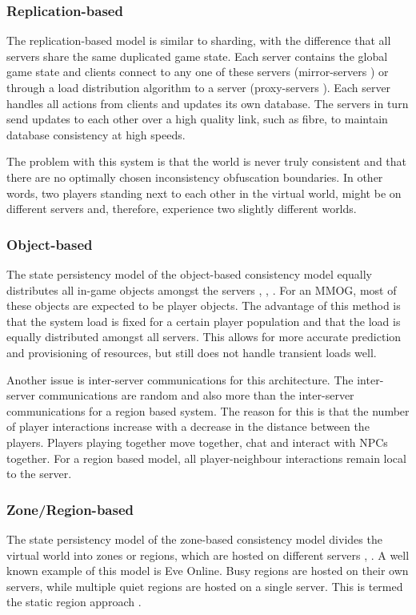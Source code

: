 \subsubsection{Replication-based}
The replication-based model is similar to sharding, with the difference that all servers share the same duplicated game state. Each server contains
the global game state and clients connect to any one of these servers (mirror-servers \cite{mirrored_server}) or through a load distribution
algorithm to a server (proxy-servers \cite{proxy_server_dist}). Each server handles all actions from clients and updates its own database. The
servers in turn send updates to each other over a high quality link, such as fibre, to maintain database consistency at high speeds.

The problem with this system is that the world is never truly consistent and that there are no optimally chosen inconsistency obfuscation boundaries.
In other words, two players standing next to each other in the virtual world, might be on different servers and, therefore, experience two slightly
different worlds.

\subsubsection{Object-based}
The state persistency model of the object-based consistency model equally distributes all in-game objects amongst the servers
\cite{object_based_consistency1}, \cite{object_based_consistency2}, \cite{object_based_consistency3}. For an MMOG, most of these objects are expected
to be player objects. The advantage of this method is that the system load is fixed for a certain player population and that the load is equally
distributed amongst all servers. This allows for more accurate prediction and provisioning of resources, but still does not handle transient loads
well.

Another issue is inter-server communications for this architecture. The inter-server communications are random and also more than the inter-server
communications for a region based system. The reason for this is that the number of player interactions increase with a decrease in the distance
between the players. Players playing together move together, chat and interact with NPCs together. For a region based model, all player-neighbour
interactions remain local to the server.

\subsubsection{Zone/Region-based}
The state persistency model of the zone-based consistency model divides the virtual world into zones or regions, which are hosted on different
servers \cite{zone_based_stat}, \cite{zone_based_dyn}. A well known example of this model is Eve Online. Busy regions are hosted on their own
servers, while multiple quiet regions are hosted on a single server. This is termed the static region approach \cite{zone_based_stat}.

